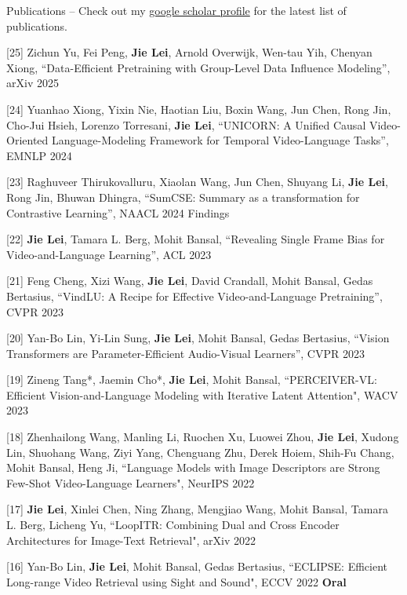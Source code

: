 \documentclass{resume} %
\begin{document}

\begin{rSection}{Publications}
    -- Check out my \href{https://scholar.google.com/citations?user=SZN9FLIAAAAJ&hl=en}{google scholar profile} for the latest list of publications.

    \item {[25]
    Zichun Yu, Fei Peng, \textbf{Jie Lei}, Arnold Overwijk, Wen-tau Yih, Chenyan Xiong,
    ``Data-Efficient Pretraining with Group-Level Data Influence Modeling'',
     arXiv 2025
    }

    \item {[24]
    Yuanhao Xiong, Yixin Nie, Haotian Liu, Boxin Wang, Jun Chen, Rong Jin, Cho-Jui Hsieh, Lorenzo Torresani, \textbf{Jie Lei},
    ``UNICORN: A Unified Causal Video-Oriented Language-Modeling Framework for Temporal Video-Language Tasks'',
     EMNLP 2024
    }

    \item {[23]
    Raghuveer Thirukovalluru, Xiaolan Wang, Jun Chen, Shuyang Li, \textbf{Jie Lei}, Rong Jin, Bhuwan Dhingra,
    ``SumCSE: Summary as a transformation for Contrastive Learning'',
     NAACL 2024 Findings
    }

    \item {[22]
    \textbf{Jie Lei}, Tamara L. Berg, Mohit Bansal,
    ``Revealing Single Frame Bias for Video-and-Language Learning'',
     ACL 2023
    }
    \item {[21]
    Feng Cheng, Xizi Wang, \textbf{Jie Lei}, David Crandall, Mohit Bansal, Gedas Bertasius,
    ``VindLU: A Recipe for Effective Video-and-Language Pretraining'',
     CVPR 2023
    }
    \item {[20]
    Yan-Bo Lin, Yi-Lin Sung, \textbf{Jie Lei}, Mohit Bansal, Gedas Bertasius,
    ``Vision Transformers are Parameter-Efficient Audio-Visual Learners'',
     CVPR 2023
    }
    \item {[19]
    Zineng Tang*, Jaemin Cho*, \textbf{Jie Lei}, Mohit Bansal,
    ``PERCEIVER-VL: Efficient Vision-and-Language Modeling with Iterative Latent Attention",
    WACV 2023
    }
    \item {[18]
    Zhenhailong Wang, Manling Li, Ruochen Xu, Luowei Zhou,  \textbf{Jie Lei}, Xudong Lin, Shuohang Wang, Ziyi Yang, Chenguang Zhu, Derek Hoiem, Shih-Fu Chang, Mohit Bansal, Heng Ji,
    ``Language Models with Image Descriptors are Strong Few-Shot Video-Language Learners",
     NeurIPS 2022
    }
    \item {[17]
    \textbf{Jie Lei}, Xinlei Chen, Ning Zhang, Mengjiao Wang, Mohit Bansal, Tamara L. Berg, Licheng Yu,
    ``LoopITR: Combining Dual and Cross Encoder Architectures for Image-Text Retrieval",
    arXiv 2022
    }
    \item {[16]
    Yan-Bo Lin, \textbf{Jie Lei}, Mohit Bansal, Gedas Bertasius,
    ``ECLIPSE: Efficient Long-range Video Retrieval using Sight and Sound",
     ECCV 2022 {\color{bittersweet}\textbf{Oral}}
    }


\end{rSection}
\end{document}
